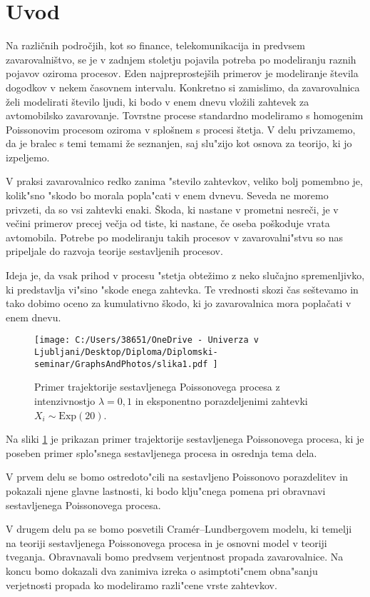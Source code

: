 \documentclass[12pt, a4paper, reqno]{amsart}
\theoremstyle{definition}
\theoremstyle{plain}
\newcommand{\1}{\mathds{1}}
\begin{document}
\section{Uvod}
Na različnih področjih, kot so finance, telekomunikacija in predvsem zavarovalništvo, 
se je v zadnjem stoletju pojavila potreba po modeliranju raznih pojavov oziroma procesov. Eden najpreprostejših primerov 
je modeliranje števila dogodkov v nekem časovnem intervalu. Konkretno si zamislimo, da zavarovalnica 
želi modelirati število ljudi, ki bodo v enem dnevu vložili zahtevek za avtomobilsko zavarovanje. 
Tovrstne procese standardno modeliramo s homogenim Poissonovim procesom oziroma v splošnem s procesi 
štetja. V delu privzamemo, da je bralec s temi temami že seznanjen, saj slu"zijo kot osnova za teorijo, 
ki jo izpeljemo. 

V praksi zavarovalnico redko zanima "stevilo zahtevkov, veliko bolj pomembno je, kolik"sno "skodo bo 
morala popla"cati v enem dvnevu. Seveda ne 
moremo privzeti, da so vsi zahtevki enaki. Škoda, ki nastane v prometni nesreči, je v večini primerov precej 
večja od tiste, ki nastane, če oseba poškoduje vrata avtomobila. Potrebe po modeliranju takih procesov
v zavarovalni"stvu so nas pripeljale do razvoja teorije sestavljenih procesov.

Ideja je, da vsak prihod v procesu "stetja obtežimo z neko slučajno spremenljivko, ki predstavlja vi"sino "skode enega
zahtevka. 
Te vrednosti skozi čas seštevamo in tako dobimo oceno za kumulativno škodo, ki jo zavarovalnica 
mora poplačati v enem dnevu.
    \begin{figure}[H]
        \centering
        \texttt{[image: 
            C:/Users/38651/OneDrive - Univerza v Ljubljani/Desktop/Diploma/Diplomski-seminar/GraphsAndPhotos/slika1.pdf
            ]}
        \caption{Primer trajektorije sestavljenega Poissonovega procesa z intenzivnostjo $\lambda = 0{,}1$ in
        eksponentno porazdeljenimi zahtevki $X_i\sim\text{Exp}(20)$.}
        \label{fig:slika1}
    \end{figure}
    \noindent
    Na sliki \ref{fig:slika1} je prikazan primer trajektorije sestavljenega Poissonovega procesa, ki je 
    poseben primer splo"snega sestavljenega procesa in osrednja tema dela. 

    V prvem delu se bomo ostredoto"cili na sestavljeno Poissonovo porazdelitev in pokazali 
    njene glavne lastnosti, ki bodo klju"cnega pomena pri obravnavi sestavljenega Poissonovega procesa.

    V drugem delu pa se bomo posvetili Cramér--Lundbergovem modelu, ki temelji na teoriji
    sestavljenega Poissonovega procesa in je
    osnovni model v teoriji tveganja. Obravnavali bomo predvsem verjentnost propada zavarovalnice. Na koncu 
    bomo dokazali dva zanimiva izreka o asimptoti"cnem obna"sanju verjetnosti propada ko modeliramo 
    razli"cene vrste zahtevkov. 
    
\end{document}
